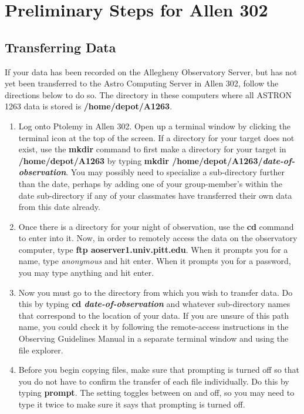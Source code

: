 \documentclass[11pt]{report}
\begin{document}
\section{Preliminary Steps for Allen 302}

\subsection{Transferring Data}
If your data has been recorded on the Allegheny Observatory Server, but has not yet been transferred to the Astro Computing Server in Allen 302, follow the directions below to do so. The directory in these computers where all ASTRON 1263 data is stored is {\bf /home/depot/A1263}. \newline

\begin{enumerate}
\item Log onto Ptolemy in Allen 302. Open up a terminal window by clicking the terminal icon at the top of the screen. If a directory for your target does not exist, use the {\bf mkdir} command to first make a directory for your target in {\bf /home/depot/A1263} by typing {\bf mkdir /home/depot/A1263/\emph{date-of-observation}}. You may possibly need to specialize a sub-directory further than the date, perhaps by adding one of your group-member's within the date sub-directory if any of your classmates have transferred their own data from this date already.
\item Once there is a directory for your night of observation, use the {\bf cd} command to enter into it. Now, in order to remotely access the data on the observatory computer, type {\bf ftp aoserver1.univ.pitt.edu}. When it prompts you for a name, type \emph{anonymous} and hit enter. When it prompts you for a password, you may type anything and hit enter.
\item Now you must go to the directory from which you wish to transfer data. Do this by typing {\bf cd \emph{date-of-observation}} and whatever sub-directory names that correspond to the location of your data. If you are unsure of this path name, you could check it by following the remote-access instructions in the Observing Guidelines Manual in a separate terminal window and using the file explorer.
\item Before you begin copying files, make sure that prompting is turned off so that you do not have to confirm the transfer of each file individually. Do this by typing {\bf prompt}. The setting toggles between on and off, so you may need to type it twice to make sure it says that prompting is turned off.

\end{enumerate}
\end{document}
